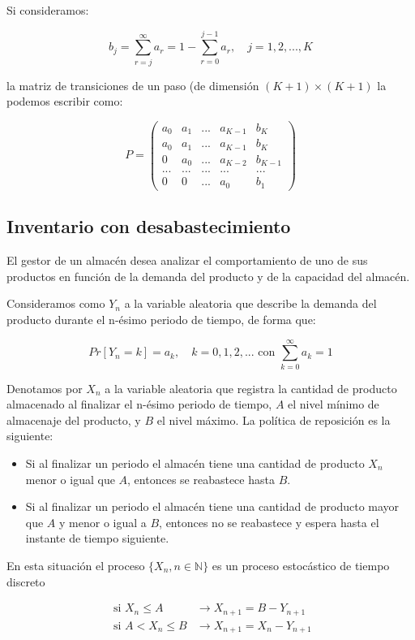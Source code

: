 \documentclass[
]{book}
\providecommand{\tightlist}{%
  \setlength{\itemsep}{0pt}\setlength{\parskip}{0pt}}
\theoremstyle{definition}
\theoremstyle{definition}
\theoremstyle{definition}
\theoremstyle{definition}
\theoremstyle{remark}
\begin{document}
Si consideramos:

\[b_j = \sum_{r=j}^{\infty} a_r=1-\sum_{r=0}^{j-1} a_r, \quad j=1,2,...,K\]

la matriz de transiciones de un paso (de dimensión \((K+1) \times (K+1)\) la podemos escribir como:

\[P = 
\begin{pmatrix}
a_0 & a_1 & ... & a_{K-1} & b_K\\
a_0 & a_1 & ... & a_{K-1} & b_K\\
0 & a_0 & ... & a_{K-2} & b_{K-1}\\
...&...&...&...&...\\
0 & 0 & ... & a_0 & b_1
\end{pmatrix}\]

\hypertarget{inventario2}{%
\subsection{Inventario con desabastecimiento}\label{inventario2}}

El gestor de un almacén desea analizar el comportamiento de uno de sus productos en función de la demanda del producto y de la capacidad del almacén.

Consideramos como \(Y_n\) a la variable aleatoria que describe la demanda del producto durante el n-ésimo periodo de tiempo, de forma que:

\[Pr[Y_n = k] = a_k, \quad k=0, 1, 2,...  \text{ con } \sum_{k=0}^{\infty} a_k =1\]

Denotamos por \(X_n\) a la variable aleatoria que registra la cantidad de producto almacenado al finalizar el n-ésimo periodo de tiempo, \(A\) el nivel mínimo de almacenaje del producto, y \(B\) el nivel máximo. La política de reposición es la siguiente:

\begin{itemize}
\tightlist
\item
  Si al finalizar un periodo el almacén tiene una cantidad de producto \(X_n\) menor o igual que \(A\), entonces se reabastece hasta \(B\).
\item
  Si al finalizar un periodo el almacén tiene una cantidad de producto mayor que \(A\) y menor o igual a \(B\), entonces no se reabastece y espera hasta el instante de tiempo siguiente.
\end{itemize}

En esta situación el proceso \(\{X_n, n \in \mathbb{N}\}\) es un proceso estocástico de tiempo discreto

\[\begin{array}{ll}
\text{ si } X_n \leq A & \rightarrow X_{n+1} = B - Y_{n+1} \\
\text{ si } A < X_n \leq B & \rightarrow X_{n+1} = X_n - Y_{n+1} 
\end{array}\]
\end{document}
